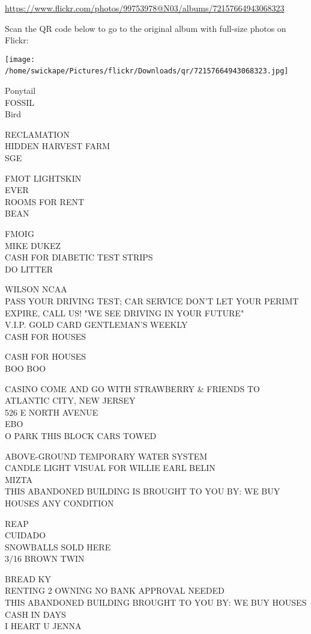 \documentclass[10pt,letterpaper]{article}
\begin{document}
\url{https://www.flickr.com/photos/99753978@N03/albums/72157664943068323}

Scan the QR code below to go to the original album with full-size photos on Flickr:

\texttt{[image: /home/swickape/Pictures/flickr/Downloads/qr/72157664943068323.jpg]}
\

Ponytail\\
FOSSIL\\
Bird

RECLAMATION\\
HIDDEN HARVEST FARM\\
SGE

FMOT LIGHTSKIN\\
EVER\\
ROOMS FOR RENT\\
BEAN

FMOIG\\
MIKE DUKEZ\\
CASH FOR DIABETIC TEST STRIPS\\
DO LITTER

WILSON NCAA\\
PASS YOUR DRIVING TEST; CAR SERVICE DON'T LET YOUR PERIMT EXPIRE, CALL US!  "WE SEE DRIVING IN YOUR FUTURE"\\
V.I.P. GOLD CARD GENTLEMAN'S WEEKLY\\
CASH FOR HOUSES

CASH FOR HOUSES\\
BOO BOO

CASINO COME AND GO WITH STRAWBERRY \& FRIENDS TO ATLANTIC CITY, NEW JERSEY\\
526 E NORTH AVENUE\\
EBO\\
O PARK THIS BLOCK CARS TOWED

ABOVE{-}GROUND TEMPORARY WATER SYSTEM\\
CANDLE LIGHT VISUAL FOR WILLIE EARL BELIN\\
MIZTA\\
THIS ABANDONED BUILDING IS BROUGHT TO YOU BY: WE BUY HOUSES ANY CONDITION

REAP\\
CUIDADO\\
SNOWBALLS SOLD HERE\\
3/16 BROWN TWIN

BREAD KY\\
RENTING 2 OWNING NO BANK APPROVAL NEEDED\\
THIS ABANDONED BUILDING BROUGHT TO YOU BY: WE BUY HOUSES CASH IN DAYS\\
I HEART U JENNA
\end{document}
